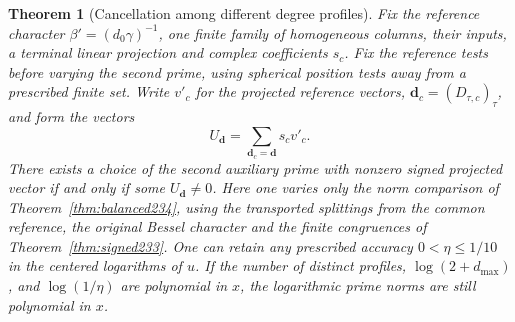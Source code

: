 \documentclass[a4paper,11pt]{article}
\newtheorem{theorem}[proposition]{Theorem}
\theoremstyle{definition}
\theoremstyle{remark}
\numberwithin{equation}{section}
\begin{document}
\begin{theorem}[Cancellation among different degree profiles]
\label{thm:sampling234}
Fix the reference character \(\beta'=(d_0\gamma)^{-1}\), one
finite family of homogeneous columns, their inputs, a terminal
linear projection and complex coefficients \(s_c\). Fix the
reference tests before varying the second prime, using spherical
position tests away from a prescribed finite set. Write \(v'_c\)
for the projected reference vectors, \(\mathbf d_c=(D_{\tau,c})_\tau\),
and form the vectors
\[
 U_{\mathbf d}=\sum_{\mathbf d_c=\mathbf d}s_c v'_c .
\]
There exists a choice of the second auxiliary prime with nonzero
signed projected vector if and only if some \(U_{\mathbf d}\ne0\).
Here one varies only the norm comparison of
Theorem~\ref{thm:balanced234}, using the transported splittings
from the common reference, the original Bessel character and
the finite congruences of Theorem~\ref{thm:signed233}.
One can retain any prescribed accuracy \(0<\eta\le1/10\) in the
centered logarithms of \(u\). If the number of distinct profiles,
\(\log(2+d_{\max})\), and \(\log(1/\eta)\) are polynomial in \(x\),
the logarithmic prime norms are still polynomial in \(x\).
\end{theorem}
\end{document}
